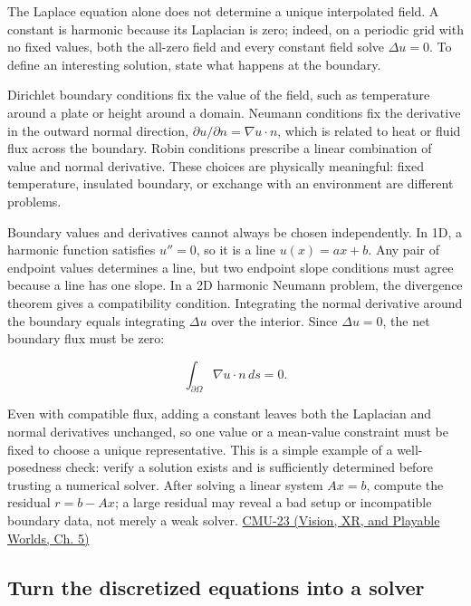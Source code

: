 The Laplace equation alone does not determine a unique interpolated field. A constant is harmonic because its Laplacian is zero; indeed, on a periodic grid with no fixed values, both the all-zero field and every constant field solve \(\Delta u=0\). To define an interesting solution, state what happens at the boundary.

Dirichlet boundary conditions fix the value of the field, such as temperature around a plate or height around a domain. Neumann conditions fix the derivative in the outward normal direction, \(\partial u/\partial n=\nabla u\cdot n\), which is related to heat or fluid flux across the boundary. Robin conditions prescribe a linear combination of value and normal derivative. These choices are physically meaningful: fixed temperature, insulated boundary, or exchange with an environment are different problems.

Boundary values and derivatives cannot always be chosen independently. In 1D, a harmonic function satisfies \(u''=0\), so it is a line \(u(x)=ax+b\). Any pair of endpoint values determines a line, but two endpoint slope conditions must agree because a line has one slope. In a 2D harmonic Neumann problem, the divergence theorem gives a compatibility condition. Integrating the normal derivative around the boundary equals integrating \(\Delta u\) over the interior. Since \(\Delta u=0\), the net boundary flux must be zero:

\[
\int_{\partial\Omega}\nabla u\cdot n\,ds=0.
\]

Even with compatible flux, adding a constant leaves both the Laplacian and normal derivatives unchanged, so one value or a mean-value constraint must be fixed to choose a unique representative. This is a simple example of a well-posedness check: verify a solution exists and is sufficiently determined before trusting a numerical solver. After solving a linear system \(Ax=b\), compute the residual \(r=b-Ax\); a large residual may reveal a bad setup or incompatible boundary data, not merely a weak solver. \href{../07-Vision-XR-and-Playable-Worlds/main.pdf\#nameddest=04-visual-computing-ii-ch036-cmu-23---physically-based-animation-and-pdes}{CMU-23 (Vision, XR, and Playable Worlds, Ch. 5)}

\subsection{Turn the discretized equations into a solver}\label{04-visual-computing-ii-ch030-turn-the-discretized-equations-into-a-solver}

